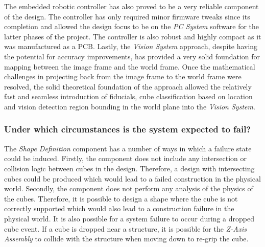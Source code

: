 The embedded robotic controller has also proved to be a very reliable component of the design. The controller has only required minor firmware tweaks since its completion and allowed the design focus to be on the \textit{PC System} software for the latter phases of the project. The controller is also robust and highly compact as it was manufactured as a PCB. Lastly, the \textit{Vision System} approach, despite having the potential for accuracy improvements, has provided a very solid foundation for mapping between the image frame and the world frame. Once the mathematical challenges in projecting back from the image frame to the world frame were resolved, the solid theoretical foundation of the approach allowed the relatively fast and seamless introduction of fiducials, cube classification based on location and vision detection region bounding in the world plane into the \textit{Vision System}.


\subsubsection{Under which circumstances is the system expected to fail?}


The \textit{Shape Definition} component has a number of ways in which a failure state could be induced. Firstly, the component does not include any intersection or collision logic between cubes in the design. Therefore, a design with intersecting cubes could be produced which would lead to a failed construction in the physical world. Secondly, the component does not perform any analysis of the physics of the cubes. Therefore, it is possible to design a shape where the cube is not correctly supported which would also lead to a construction failure in the physical world. It is also possible for a system failure to occur during a dropped cube event. If a cube is dropped near a structure, it is possible for the \textit{Z-Axis Assembly} to collide with the structure when moving down to re-grip the cube.

